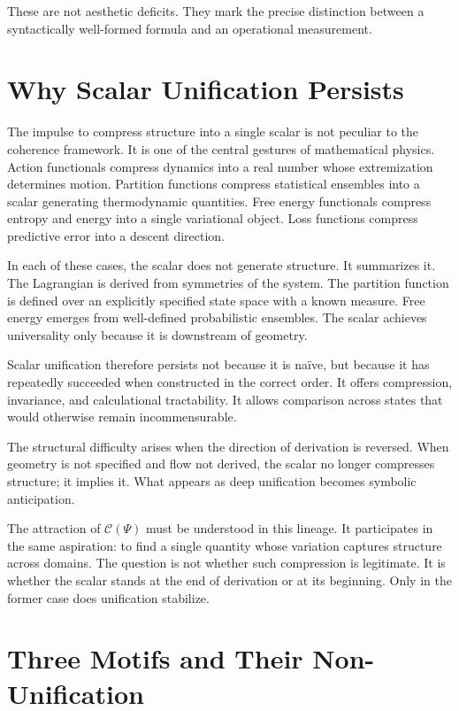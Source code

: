 \documentclass[12pt]{article}
\begin{document}
These are not aesthetic deficits. They mark the precise distinction between a syntactically well-formed formula and an operational measurement.

\section{Why Scalar Unification Persists}

The impulse to compress structure into a single scalar is not peculiar to the coherence framework. It is one of the central gestures of mathematical physics. Action functionals compress dynamics into a real number whose extremization determines motion. Partition functions compress statistical ensembles into a scalar generating thermodynamic quantities. Free energy functionals compress entropy and energy into a single variational object. Loss functions compress predictive error into a descent direction.

In each of these cases, the scalar does not generate structure. It summarizes it. The Lagrangian is derived from symmetries of the system. The partition function is defined over an explicitly specified state space with a known measure. Free energy emerges from well-defined probabilistic ensembles. The scalar achieves universality only because it is downstream of geometry.

Scalar unification therefore persists not because it is naïve, but because it has repeatedly succeeded when constructed in the correct order. It offers compression, invariance, and calculational tractability. It allows comparison across states that would otherwise remain incommensurable.

The structural difficulty arises when the direction of derivation is reversed. When geometry is not specified and flow not derived, the scalar no longer compresses structure; it implies it. What appears as deep unification becomes symbolic anticipation.

The attraction of $\mathcal{C}(\Psi)$ must be understood in this lineage. It participates in the same aspiration: to find a single quantity whose variation captures structure across domains. The question is not whether such compression is legitimate. It is whether the scalar stands at the end of derivation or at its beginning. Only in the former case does unification stabilize.

\section{Three Motifs and Their Non-Unification}
\end{document}

